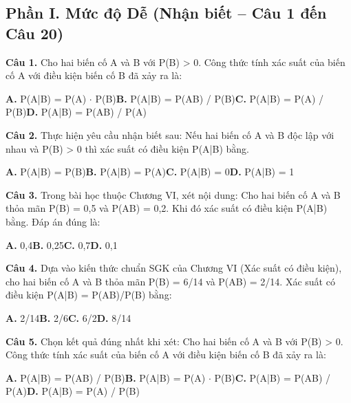 \documentclass[11pt,a4paper]{article}
\begin{document}
\subsection*{\color{accent} Phần I. Mức độ Dễ (Nhận biết -- Câu 1 đến Câu 20)}
\textbf{\color{primary} Câu 1.} Cho hai biến cố A và B với P(B) > 0. Công thức tính xác suất của biến cố A với điều kiện biến cố B đã xảy ra là:\par
\hspace*{1.5em}\textbf{A.} P(A|B) = P(A) $\cdot$ P(B)\quad\quad \textbf{B.} P(A|B) = P(AB) / P(B)\quad\quad \textbf{C.} P(A|B) = P(A) / P(B)\quad\quad \textbf{D.} P(A|B) = P(AB) / P(A)\par\vspace{2pt}
\textbf{\color{primary} Câu 2.} Thực hiện yêu cầu nhận biết sau: Nếu hai biến cố A và B độc lập với nhau và P(B) > 0 thì xác suất có điều kiện P(A|B) bằng.\par
\hspace*{1.5em}\textbf{A.} P(A|B) = P(B)\quad\quad \textbf{B.} P(A|B) = P(A)\quad\quad \textbf{C.} P(A|B) = 0\quad\quad \textbf{D.} P(A|B) = 1\par\vspace{2pt}
\textbf{\color{primary} Câu 3.} Trong bài học thuộc Chương VI, xét nội dung: Cho hai biến cố A và B thỏa mãn P(B) = 0,5 và P(AB) = 0,2. Khi đó xác suất có điều kiện P(A|B) bằng. Đáp án đúng là:\par
\hspace*{1.5em}\textbf{A.} 0,4\quad\quad \textbf{B.} 0,25\quad\quad \textbf{C.} 0,7\quad\quad \textbf{D.} 0,1\par\vspace{2pt}
\textbf{\color{primary} Câu 4.} Dựa vào kiến thức chuẩn SGK của Chương VI (Xác suất có điều kiện), cho hai biến cố A và B thỏa mãn P(B) = 6/14 và P(AB) = 2/14. Xác suất có điều kiện P(A|B) = P(AB)/P(B) bằng:\par
\hspace*{1.5em}\textbf{A.} 2/14\quad\quad \textbf{B.} 2/6\quad\quad \textbf{C.} 6/2\quad\quad \textbf{D.} 8/14\par\vspace{2pt}
\textbf{\color{primary} Câu 5.} Chọn kết quả đúng nhất khi xét: Cho hai biến cố A và B với P(B) > 0. Công thức tính xác suất của biến cố A với điều kiện biến cố B đã xảy ra là:\par
\hspace*{1.5em}\textbf{A.} P(A|B) = P(AB) / P(B)\quad\quad \textbf{B.} P(A|B) = P(A) $\cdot$ P(B)\quad\quad \textbf{C.} P(A|B) = P(AB) / P(A)\quad\quad \textbf{D.} P(A|B) = P(A) / P(B)\par\vspace{2pt}
\end{document}
